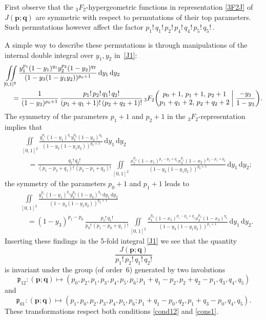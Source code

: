 \documentclass[12pt,reqno]{amsart}
\theoremstyle{remark}
\renewcommand{\d}{{\mathrm d}}
\newcommand\bp{\boldsymbol p}
\newcommand\bq{\boldsymbol q}
\newcommand\frp{\mathfrak p}
\begin{document}
First observe that the $_3F_2$-hypergeometric functions in representation \eqref{3F2J} of $J(\bp;\bq)$
are symmetric with respect to  permutations of their top parameters.
Such permutations however affect the factor $p_1!\,q_1!\,p_2!\,p_4!\,q_4!\,p_5!\,q_5!$\,.

A simple way to describe these permutations is through manipulations of the internal double integral over $y_1,y_2$ in~\eqref{J1}:
\begin{align*}
&
\iint\limits_{[0,1]^2}\frac{y_1^{p_1}(1-y_1)^{q_1}y_2^{p_2}(1-y_2)^{q_2}}
{(1-y_3(1-y_1y_2))^{p_0+1}}\,\d y_1\,\d y_2
\\ &\quad
=\frac1{(1-y_3)^{p_0+1}}
\,\frac{p_1!\,p_2!\,q_1!\,q_2!}{(p_1+q_1+1)!\,(p_2+q_2+1)!}
\,{}_3F_2\bigg(\begin{matrix} p_0+1, \, p_1+1, \, p_2+1 \\ p_1+q_1+2, \, p_2+q_2+2 \end{matrix}\biggm|\frac{-y_3}{1-y_3}\bigg).
\end{align*}
The symmetry of the parameters $p_1+1$ and $p_2+1$ in the $_3F_2$-representation implies that 
\begin{align*}
&
\iint\limits_{[0,1]^2}\frac{y_1^{p_1}(1-y_1)^{q_1}y_2^{p_2}(1-y_2)^{q_2}}
{(1-y_3(1-y_1y_2))^{p_0+1}}\,\d y_1\,\d y_2
\\ &\quad
=\frac{q_1!\,q_2!}{(p_1-p_2+q_1)!\,(p_2-p_1+q_2)!}
\iint\limits_{[0,1]^2}\frac{x_1^{p_2}(1-x_1)^{p_1-p_2+q_1}x_2^{p_1}(1-x_2)^{p_2-p_1+q_2}}
{(1-y_3(1-y_1y_2))^{p_0+1}}\,\d y_1\,\d y_2;
\end{align*}
the symmetry of the parameters $p_0+1$ and $p_1+1$ leads to
\begin{align*}
&
\iint\limits_{[0,1]^2}\frac{y_1^{p_1}(1-y_1)^{q_1}y_2^{p_2}(1-y_2)^{q_2}\,\d y_1\,\d y_2}
{(1-y_3(1-y_1y_2))^{p_0+1}}
\\ &\quad
=(1-y_3)^{p_1-p_0}
\,\frac{p_1!\,q_1!}{p_0!\,(p_1-p_0+q_1)!}
\iint\limits_{[0,1]^2}\frac{x_1^{p_0}(1-x_1)^{p_1-p_0+q_1}x_2^{p_2}(1-x_2)^{q_2}}
{(1-y_3(1-y_1y_2))^{p_1+1}}\,\d y_1\,\d y_2.
\end{align*}
Inserting these findings in the 5-fold integral \eqref{J1} we see that the quantity
\[
\frac{J(\bp;\bq)}{p_1!\,p_2!\,q_1!\,q_2!}
\]
is invariant under the group (of order~6) generated by two involutions
\[
\frp_{12}\colon(\bp;\bq)
\mapsto(p_0,p_2,p_1,p_3,p_4,p_5,p_6;p_1+q_1-p_2,p_2+q_2-p_1,q_3,q_4,q_5)
\]
and
\[
\frp_{01}\colon(\bp;\bq)
\mapsto(p_1,p_0,p_2,p_3,p_4,p_5,p_6;p_1+q_1-p_0,q_2,p_1+q_3-p_0,q_4,q_5).
\]
These transformations respect both conditions \eqref{cond12} and \eqref{cons1}.
\end{document}
